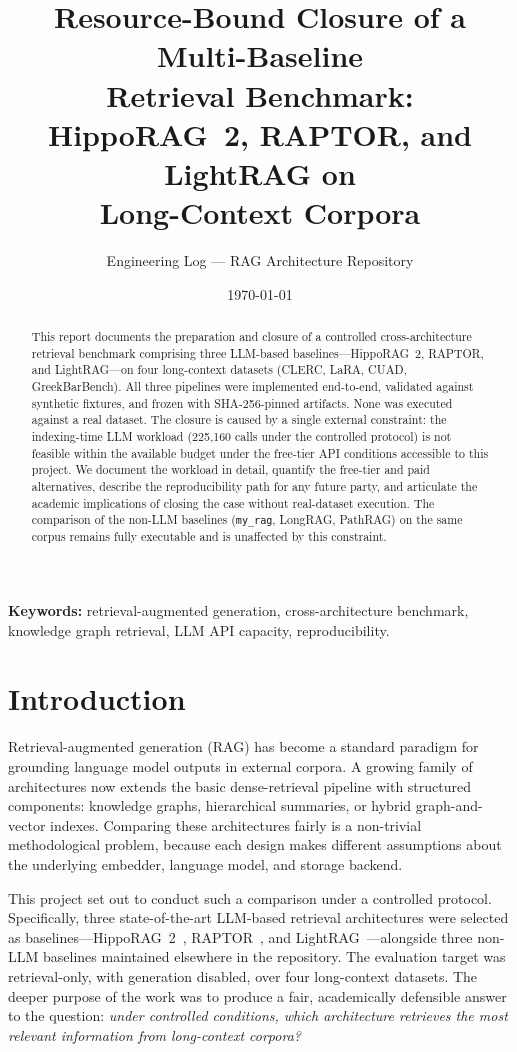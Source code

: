 \documentclass[11pt,a4paper]{article}
\title{\bfseries Resource-Bound Closure of a Multi-Baseline\\ Retrieval Benchmark:\\ HippoRAG~2, RAPTOR, and LightRAG on\\ Long-Context Corpora}
\author{Engineering Log --- RAG Architecture Repository}
\date{\today}
\begin{document}
\maketitle

\begin{abstract}
\noindent
This report documents the preparation and closure of a controlled cross-architecture retrieval benchmark comprising three LLM-based baselines---HippoRAG~2, RAPTOR, and LightRAG---on four long-context datasets (CLERC, LaRA, CUAD, GreekBarBench). All three pipelines were implemented end-to-end, validated against synthetic fixtures, and frozen with SHA-256-pinned artifacts. None was executed against a real dataset. The closure is caused by a single external constraint: the indexing-time LLM workload (225{,}160 calls under the controlled protocol) is not feasible within the available budget under the free-tier API conditions accessible to this project. We document the workload in detail, quantify the free-tier and paid alternatives, describe the reproducibility path for any future party, and articulate the academic implications of closing the case without real-dataset execution. The comparison of the non-LLM baselines (\texttt{my\_rag}, LongRAG, PathRAG) on the same corpus remains fully executable and is unaffected by this constraint.
\end{abstract}

\noindent\textbf{Keywords:} retrieval-augmented generation, cross-architecture benchmark, knowledge graph retrieval, LLM API capacity, reproducibility.

\section{Introduction}

Retrieval-augmented generation (RAG) has become a standard paradigm for grounding language model outputs in external corpora. A growing family of architectures now extends the basic dense-retrieval pipeline with structured components: knowledge graphs, hierarchical summaries, or hybrid graph-and-vector indexes. Comparing these architectures fairly is a non-trivial methodological problem, because each design makes different assumptions about the underlying embedder, language model, and storage backend.

This project set out to conduct such a comparison under a controlled protocol. Specifically, three state-of-the-art LLM-based retrieval architectures were selected as baselines---HippoRAG~2~\cite{hipporag2}, RAPTOR~\cite{raptor}, and LightRAG~\cite{lightrag}---alongside three non-LLM baselines maintained elsewhere in the repository. The evaluation target was retrieval-only, with generation disabled, over four long-context datasets. The deeper purpose of the work was to produce a fair, academically defensible answer to the question: \emph{under controlled conditions, which architecture retrieves the most relevant information from long-context corpora?}
\end{document}
